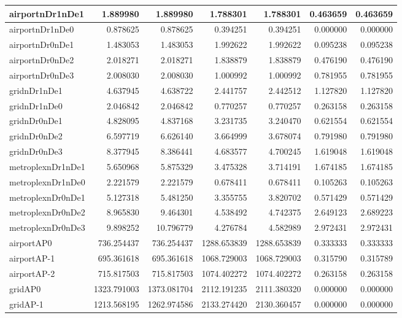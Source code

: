 \begin{longtable}{|l|r|r|r|r|r|r|}
\endlastfoot
airportnDr1nDe1 & 1.889980 & 1.889980 & 1.788301 & 1.788301 & 0.463659 & 0.463659 \\ \hline
airportnDr1nDe0 & 0.878625 & 0.878625 & 0.394251 & 0.394251 & 0.000000 & 0.000000 \\ \hline
airportnDr0nDe1 & 1.483053 & 1.483053 & 1.992622 & 1.992622 & 0.095238 & 0.095238 \\ \hline
airportnDr0nDe2 & 2.018271 & 2.018271 & 1.838879 & 1.838879 & 0.476190 & 0.476190 \\ \hline
airportnDr0nDe3 & 2.008030 & 2.008030 & 1.000992 & 1.000992 & 0.781955 & 0.781955 \\ \hline
gridnDr1nDe1 & 4.637945 & 4.638722 & 2.441757 & 2.442512 & 1.127820 & 1.127820 \\ \hline
gridnDr1nDe0 & 2.046842 & 2.046842 & 0.770257 & 0.770257 & 0.263158 & 0.263158 \\ \hline
gridnDr0nDe1 & 4.828095 & 4.837168 & 3.231735 & 3.240470 & 0.621554 & 0.621554 \\ \hline
gridnDr0nDe2 & 6.597719 & 6.626140 & 3.664999 & 3.678074 & 0.791980 & 0.791980 \\ \hline
gridnDr0nDe3 & 8.377945 & 8.386441 & 4.683577 & 4.700245 & 1.619048 & 1.619048 \\ \hline
metroplexnDr1nDe1 & 5.650968 & 5.875329 & 3.475328 & 3.714191 & 1.674185 & 1.674185 \\ \hline
metroplexnDr1nDe0 & 2.221579 & 2.221579 & 0.678411 & 0.678411 & 0.105263 & 0.105263 \\ \hline
metroplexnDr0nDe1 & 5.127318 & 5.481250 & 3.355755 & 3.820702 & 0.571429 & 0.571429 \\ \hline
metroplexnDr0nDe2 & 8.965830 & 9.464301 & 4.538492 & 4.742375 & 2.649123 & 2.689223 \\ \hline
metroplexnDr0nDe3 & 9.898252 & 10.796779 & 4.276784 & 4.582989 & 2.972431 & 2.972431 \\ \hline
airportAP0 & 736.254437 & 736.254437 & 1288.653839 & 1288.653839 & 0.333333 & 0.333333 \\ \hline
airportAP-1 & 695.361618 & 695.361618 & 1068.729003 & 1068.729003 & 0.315790 & 0.315789 \\ \hline
airportAP-2 & 715.817503 & 715.817503 & 1074.402272 & 1074.402272 & 0.263158 & 0.263158 \\ \hline
gridAP0 & 1323.791003 & 1373.081704 & 2112.191235 & 2111.380320 & 0.000000 & 0.000000 \\ \hline
gridAP-1 & 1213.568195 & 1262.974586 & 2133.274420 & 2130.360457 & 0.000000 & 0.000000 \\ \hline

\end{longtable}
